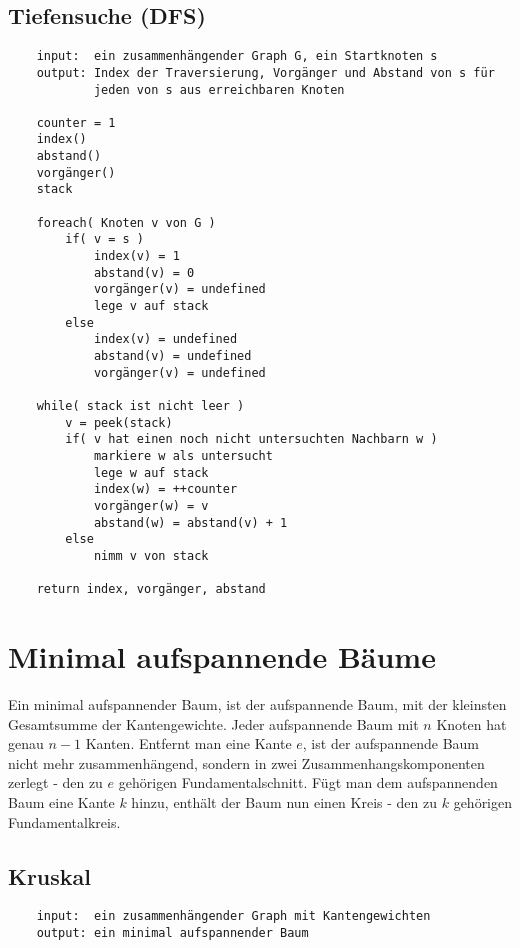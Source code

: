 \documentclass[10pt,a4paper,landscape]{article}
\begin{document}
\begin{multicols*}{2}
            \subsection*{ Tiefensuche (DFS) }
            \begin{verbatim}
    input:  ein zusammenhängender Graph G, ein Startknoten s
    output: Index der Traversierung, Vorgänger und Abstand von s für 
            jeden von s aus erreichbaren Knoten

    counter = 1
    index()
    abstand()
    vorgänger()
    stack

    foreach( Knoten v von G )
        if( v = s )
            index(v) = 1
            abstand(v) = 0
            vorgänger(v) = undefined
            lege v auf stack
        else
            index(v) = undefined
            abstand(v) = undefined
            vorgänger(v) = undefined

    while( stack ist nicht leer )
        v = peek(stack)
        if( v hat einen noch nicht untersuchten Nachbarn w )
            markiere w als untersucht
            lege w auf stack
            index(w) = ++counter
            vorgänger(w) = v
            abstand(w) = abstand(v) + 1
        else
            nimm v von stack

    return index, vorgänger, abstand
            \end{verbatim}


        \section{ Minimal aufspannende Bäume }
            Ein minimal aufspannender Baum, ist der aufspannende Baum, mit der kleinsten Gesamtsumme der Kantengewichte.
            Jeder aufspannende Baum mit $n$ Knoten hat genau $n-1$ Kanten. Entfernt man eine Kante $e$, ist der 
            aufspannende Baum nicht mehr zusammenhängend, sondern in zwei Zusammenhangskomponenten zerlegt - den zu $e$ 
            gehörigen Fundamentalschnitt. Fügt man dem aufspannenden Baum eine Kante $k$ hinzu, enthält der Baum nun 
            einen Kreis - den zu $k$ gehörigen Fundamentalkreis.
            \subsection{ Kruskal }
            \begin{verbatim}
    input:  ein zusammenhängender Graph mit Kantengewichten
    output: ein minimal aufspannender Baum


\end{verbatim}
\end{multicols*}
\end{document}
